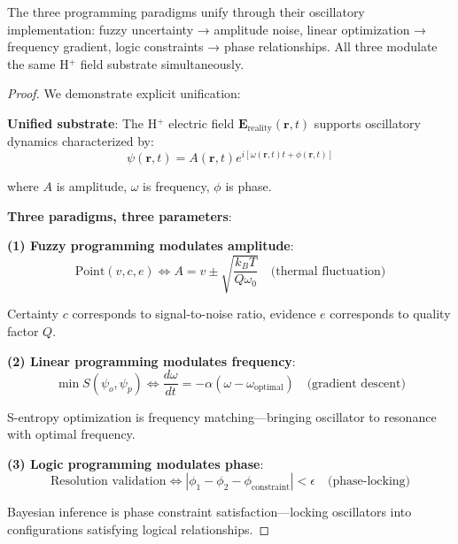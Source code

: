 \begin{theorem}
\label{thm:tri_paradigm_unification}
The three programming paradigms unify through their oscillatory implementation: fuzzy uncertainty → amplitude noise, linear optimization → frequency gradient, logic constraints → phase relationships. All three modulate the same H\(^+\) field substrate simultaneously.
\end{theorem}

\begin{proof}
We demonstrate explicit unification:

\textbf{Unified substrate}: The H\(^+\) electric field $\mathbf{E}_{\text{reality}}(\mathbf{r}, t)$ supports oscillatory dynamics characterized by:
\begin{equation}
\psi(\mathbf{r}, t) = A(\mathbf{r}, t) e^{i[\omega(\mathbf{r}, t) t + \phi(\mathbf{r}, t)]}
\end{equation}

where $A$ is amplitude, $\omega$ is frequency, $\phi$ is phase.

\textbf{Three paradigms, three parameters}:

\textbf{(1) Fuzzy programming modulates amplitude}:
\begin{equation}
\text{Point}(v, c, e) \iff A = v \pm \sqrt{\frac{k_B T}{Q\omega_0}} \quad \text{(thermal fluctuation)}
\end{equation}

Certainty $c$ corresponds to signal-to-noise ratio, evidence $e$ corresponds to quality factor $Q$.

\textbf{(2) Linear programming modulates frequency}:
\begin{equation}
\min S(\psi_o, \psi_p) \iff \frac{d\omega}{dt} = -\alpha(\omega - \omega_{\text{optimal}}) \quad \text{(gradient descent)}
\end{equation}

S-entropy optimization is frequency matching—bringing oscillator to resonance with optimal frequency.

\textbf{(3) Logic programming modulates phase}:
\begin{equation}
\text{Resolution validation} \iff |\phi_1 - \phi_2 - \phi_{\text{constraint}}| < \epsilon \quad \text{(phase-locking)}
\end{equation}

Bayesian inference is phase constraint satisfaction—locking oscillators into configurations satisfying logical relationships.


\end{proof}
